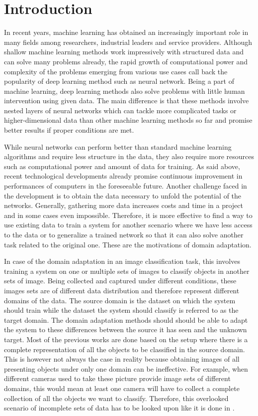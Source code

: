 \chapter[Introduction]{Introduction}

In recent years, machine learning has obtained an increasingly important role in many fields among researchers, industrial leaders and service providers. Although shallow machine learning methods work impressively with structured data and can solve many problems already, the rapid growth of computational power and complexity of the problems emerging from various use cases call back the popularity of deep learning method such as neural network. Being a part of machine learning, deep learning methods also solve problems with little human intervention using given data. The main difference is that these methods involve nested layers of neural networks which can tackle more complicated tasks or higher-dimensional data than other machine learning methods so far and promise better results if proper conditions are met. 

While neural networks can perform better than standard machine learning algorithms and require less structure in the data, they also require more resources such as computational power and amount of data for training. As said above, recent technological developments already promise continuous improvement in performances of computers in the foreseeable future. Another challenge faced in the development is to obtain the data necessary to unfold the potential of the networks. Generally, gathering more data increases costs and time in a project and in some cases even impossible. Therefore, it is more effective to find a way to use existing data to train a system for another scenario where we have less access to the data or to generalize a trained network so that it can also solve another task related to the original one. These are the motivations of domain adaptation.

In case of the domain adaptation in an image classification task, this involves training a system on one or multiple sets of images to classify objects in another sets of image. Being collected and captured under different conditions, these images sets are of different data distribution and therefore represent different domains of the data. The source domain is the dataset on which the system should train while the dataset the system should classify is referred to as the target domain. The domain adaptation methods should should be able to adapt the system to these differences between the source it has seen and the unknown target. Most of the previous works are done based on the setup where there is a complete representation of all the objects to be classified in the source domain. This is however not always the case in reality because obtaining images of all presenting objects under only one domain can be ineffective. For example, when different cameras used to take these picture provide image sets of different domains, this would mean at least one camera will have to collect a complete collection of all the objects we want to classify. Therefore, this overlooked scenario of incomplete sets of data has to be looked upon like it is done in \cite{domainMixture}. 

